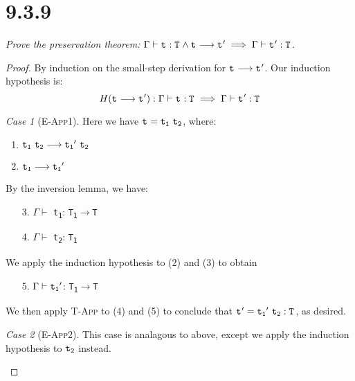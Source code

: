 \documentclass{article}
\newcommand{\term}[1]{\texttt{t\textsubscript{#1}}}
\newcommand{\ty}[1]{\texttt{T\textsubscript{#1}}}
\newcommand{\fn}[2]{#1$\rightarrow$#2}
\renewcommand{\ss}[2]{#1 \longrightarrow #2}
\theoremstyle{remark}
\newtheorem*{case}{Case}
\begin{document}
\section{9.3.9}

    \textit{Prove the preservation theorem:}
    $
        \Gamma\vdash\term{}:\ty{} \land \ss{\term{}}{\term{}'}
        \implies
        \Gamma\vdash\term{}':\ty{}
    $.

    \begin{proof}
        By induction on the small-step derivation for $\ss{\term{}}{\term{}'}$. Our induction hypothesis is:
        $$H(\ss{\term{}}{\term{}'}): \Gamma\vdash\term{}:\ty{} \implies \Gamma\vdash\term{}':\ty{}$$

        \begin{case}[\textsc{E-App1}]
            Here we have $\term{} = \term{1}\ \term{2}$, where:
            \begin{enumerate}
                \item $\ss{\term{1}\ \term{2}}{\term{1}'\ \term{2}}$
                \item $\ss{\term{1}}{\term{1}'}$
            \end{enumerate}
            By the inversion lemma, we have:
            \begin{enumerate}
                \item[3.] $\Gamma \vdash$ \term{1}: \fn{\ty{1}}{\ty{}}
                \item[4.] $\Gamma \vdash$ \term{2}: \ty{1}
            \end{enumerate}
            We apply the induction hypothesis to (2) and (3) to obtain
            \begin{enumerate}
                \item[5.] $\Gamma \vdash \term{1}'$: \fn{\ty{1}}{\ty{}}
            \end{enumerate}
            We then apply \textsc{T-App} to (4) and (5) to conclude that $\term{}' = \term{1}'\ \term{2}: \ty{}$, as desired.
        \end{case}

        \begin{case}[\textsc{E-App2}]
            This case is analagous to above, except we apply the induction hypothesis to $\term{2}$ instead.
        \end{case}


\end{proof}
\end{document}

